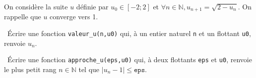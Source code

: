 \exer{}
\setcounter{numques}{0}

On considère la suite $u$ définie par $u_0 \in [-2;2]$ et $\forall n \in \mathbb{N}, u_{n+1} = \sqrt{2-u_n}$.
On rappelle que $u$ converge vers 1.


\question\ \'Ecrire une fonction \texttt{valeur\_u(n,u0)} qui, à un entier naturel \texttt{n} et un flottant \texttt{u0}, renvoie  $u_n$.

\question\ \'Ecrire une fonction \texttt{approche\_u(eps,u0)} qui, à deux flottants \texttt{eps} et \texttt{u0}, renvoie le plus petit rang $n\in \mathbb{N}$ tel que $\left| u_n - 1 \right| \leq \texttt{eps}$.
